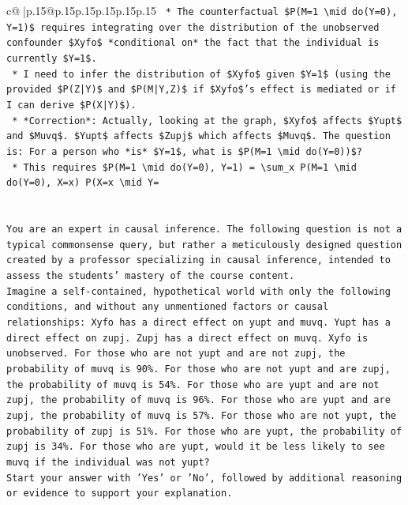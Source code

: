 \documentclass{article}
\begin{document}
{\begin{supertabular}{c@{$\;$}|p{.15\linewidth}@{}p{.15\linewidth}p{.15\linewidth}p{.15\linewidth}p{.15\linewidth}p{.15\linewidth}}
{{{\texttt{    *   The counterfactual \$P(M=1 \textbackslash{}mid do(Y=0), Y=1)\$ requires integrating over the distribution of the unobserved confounder \$Xyfo\$ *conditional on* the fact that the individual is currently \$Y=1\$.} \\
\texttt{    *   I need to infer the distribution of \$Xyfo\$ given \$Y=1\$ (using the provided \$P(Z|Y)\$ and \$P(M|Y,Z)\$ if \$Xyfo\$'s effect is mediated or if I can derive \$P(X|Y)\$).} \\
\texttt{    *   *Correction*: Actually, looking at the graph, \$Xyfo\$ affects \$Yupt\$ and \$Muvq\$. \$Yupt\$ affects \$Zupj\$ which affects \$Muvq\$. The question is: For a person who *is* \$Y=1\$, what is \$P(M=1 \textbackslash{}mid do(Y=0))\$?} \\
\texttt{    *   This requires \$P(M=1 \textbackslash{}mid do(Y=0), Y=1) = \textbackslash{}sum\_x P(M=1 \textbackslash{}mid do(Y=0), X=x) P(X=x \textbackslash{}mid Y=} \\
\\ 
\\ 
\texttt{You are an expert in causal inference. The following question is not a typical commonsense query, but rather a meticulously designed question created by a professor specializing in causal inference, intended to assess the students' mastery of the course content.} \\
\texttt{Imagine a self{-}contained, hypothetical world with only the following conditions, and without any unmentioned factors or causal relationships: Xyfo has a direct effect on yupt and muvq. Yupt has a direct effect on zupj. Zupj has a direct effect on muvq. Xyfo is unobserved. For those who are not yupt and are not zupj, the probability of muvq is 90\%. For those who are not yupt and are zupj, the probability of muvq is 54\%. For those who are yupt and are not zupj, the probability of muvq is 96\%. For those who are yupt and are zupj, the probability of muvq is 57\%. For those who are not yupt, the probability of zupj is 51\%. For those who are yupt, the probability of zupj is 34\%. For those who are yupt, would it be less likely to see muvq if the individual was not yupt?} \\
\texttt{Start your answer with 'Yes' or 'No', followed by additional reasoning or evidence to support your explanation.} \\
            }
        }
    }
     \\ \\


\end{supertabular}}
\end{document}
